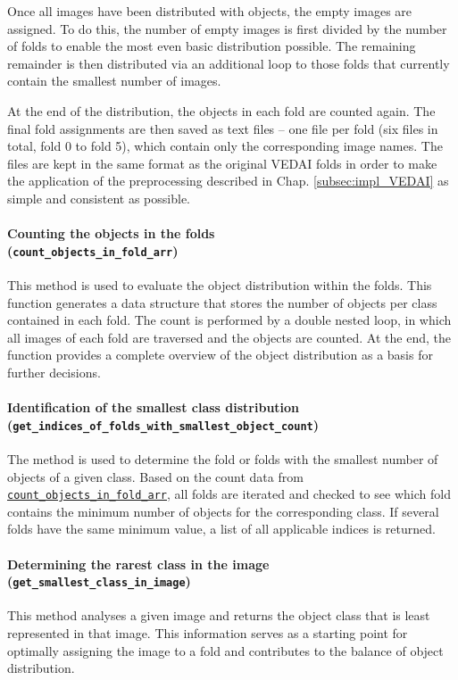 Once all images have been distributed with objects, the empty images are assigned. To do this, the number of empty images is first divided by the number of folds to enable the most even basic distribution possible. The remaining remainder is then distributed via an additional loop to those folds that currently contain the smallest number of images.

At the end of the distribution, the objects in each fold are counted again. The final fold assignments are then saved as text files – one file per fold (six files in total, fold 0 to fold 5), which contain only the corresponding image names. The files are kept in the same format as the original \acrshort{VEDAI} folds in order to make the application of the preprocessing described in Chap. \ref{subsec:impl_VEDAI} as simple and consistent as possible.


\paragraph{Counting the objects in the folds \\ (\lstinline|count_objects_in_fold_arr|)}
\hypertarget{par:count_objects_in_fold_arr}{}

This method is used to evaluate the object distribution within the folds. This function generates a data structure that stores the number of objects per class contained in each fold. The count is performed by a double nested loop, in which all images of each fold are traversed and the objects are counted. At the end, the function provides a complete overview of the object distribution as a basis for further decisions.


\paragraph{Identification of the smallest class distribution \\ (\lstinline|get_indices_of_folds_with_smallest_object_count|)}
\hypertarget{par:get_indices_folds_with_smallest_object_count}{}

The method is used to determine the fold or folds with the smallest number of objects of a given class. Based on the count data from \hyperlink{par:count_objects_in_fold_arr}{\lstinline|count_objects_in_fold_arr|}, all folds are iterated and checked to see which fold contains the minimum number of objects for the corresponding class. If several folds have the same minimum value, a list of all applicable indices is returned.

\paragraph{Determining the rarest class in the image \\ (\lstinline|get_smallest_class_in_image|)}
\hypertarget{par:get_smallest_class_in_image}{}

This method analyses a given image and returns the object class that is least represented in that image. This information serves as a starting point for optimally assigning the image to a fold and contributes to the balance of object distribution.
